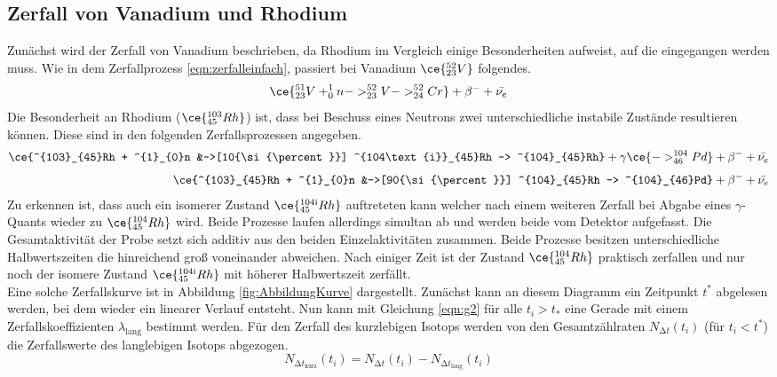 \subsection{Zerfall von Vanadium und Rhodium}
\label{sec:zerfallxd}
Zunächst wird der Zerfall von Vanadium beschrieben, da Rhodium im Vergleich einige Besonderheiten aufweist, auf die eingegangen werden muss.
Wie in dem Zerfallprozess \eqref{eqn:zerfalleinfach}, passiert bei Vanadium $\ce{^{52}_{23}V}$ folgendes.
\begin{equation}
\ce{^{51}_{23}V + ^{1}_{0}n -> ^{52}_{23}V -> ^{52}_{24}Cr} + {\beta}^{-} + \bar{\nu_{e}} 
\end{equation}
Die Besonderheit an Rhodium ($\ce{^{103}_{45}Rh}$) ist, dass bei Beschuss eines Neutrons zwei unterschiedliche instabile Zustände resultieren können. 
Diese sind in den folgenden Zerfallsprozessen angegeben.
\begin{align}
\ce{^{103}_{45}Rh + ^{1}_{0}n &->[10{\si{\percent}}] ^{104\text{i}}_{45}Rh -> ^{104}_{45}Rh} + \gamma \ce{-> ^{104}_{46}Pd} + {\beta}^{-} + \bar{\nu_{e}} \\[3pt]
\ce{^{103}_{45}Rh + ^{1}_{0}n &->[90{\si{\percent}}] ^{104}_{45}Rh -> ^{104}_{46}Pd} + {\beta}^{-} + \bar{\nu_{e}} 
\end{align}
Zu erkennen ist, dass auch ein isomerer Zustand $\ce{^{104{\text{i}}}_{45}Rh}$ auftreteten kann welcher nach einem weiteren Zerfall bei Abgabe eines $\gamma$-Quants wieder zu $\ce{^{104}_{45}Rh}$ wird.
Beide Prozesse laufen allerdings simultan ab und werden beide vom Detektor aufgefasst. 
Die Gesamtaktivität der Probe setzt sich additiv aus den beiden Einzelaktivitäten zusammen. Beide Prozesse besitzen unterschiedliche Halbwertszeiten die hinreichend
groß voneinander abweichen. Nach einiger Zeit ist der Zustand $\ce{^{104}_{45}Rh}$ praktisch zerfallen und nur noch der isomere Zustand $\ce{^{104{\text{i}}}_{45}Rh}$ mit höherer Halbwertszeit zerfällt.
\\
\newline
Eine solche Zerfallskurve ist in Abbildung \ref{fig:AbbildungKurve} dargestellt.
Zunächst kann an diesem Diagramm ein Zeitpunkt $t^{*}$ abgelesen werden, bei dem wieder ein linearer Verlauf entsteht. Nun kann mit Gleichung 
\eqref{eqn:g2} für alle $t_{i} > t_{*}$ eine Gerade mit einem Zerfallskoeffizienten $\lambda_{\text{lang}}$ bestimmt werden.
Für den Zerfall des kurzlebigen Isotops werden von den Gesamtzählraten $N_{\increment t}(t_{i})$ (für $t_{i} < t^{*}$) die Zerfallswerte des langlebigen Isotops abgezogen.
\begin{equation}
\label{eqn:kurz}
N_{{\increment t}_{\text{kurz}}}(t_{i}) = N_{\increment t}(t_{i}) - N_{{\increment t}_{\text{lang}}}(t_{i})
\end{equation}
